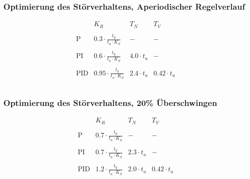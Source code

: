 \subsubsection{Optimierung des Störverhaltens, Aperiodischer Regelverlauf}
\[
    \begin{array}{lccc}
        &
            K_R &
            T_N &
            T_V \\\\
        \text{P} &
            0.3 \cdot \frac{t_g}{t_u \cdot K_S} &
            - &
            - \\\\
        \text{PI} &
            0.6 \cdot \frac{t_g}{t_u \cdot K_S} &
            4.0 \cdot t_u &
            - \\\\
        \text{PID} &
            0.95 \cdot \frac{t_g}{t_u \cdot K_S} &
            2.4 \cdot t_u &
            0.42 \cdot t_u \\\\
    \end{array}
\]

\subsubsection{Optimierung des Störverhaltens, 20\% Überschwingen}
\[
    \begin{array}{lccc}
        &
            K_R &
            T_N &
            T_V \\\\
        \text{P} &
            0.7 \cdot \frac{t_g}{t_u \cdot K_S} &
            - &
            - \\\\
        \text{PI} &
            0.7 \cdot \frac{t_g}{t_u \cdot K_S} &
            2.3 \cdot t_u &
            - \\\\
        \text{PID} &
            1.2 \cdot \frac{t_g}{t_u \cdot K_S} &
            2.0 \cdot t_u &
            0.42 \cdot t_u \\\\
    \end{array}
\]

